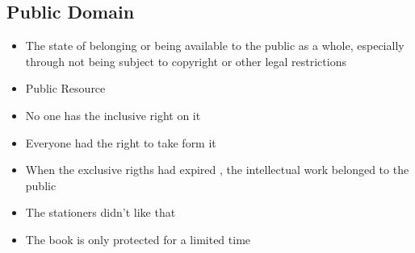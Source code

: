 \documentclass{article}
\begin{document}
\subsection{Public Domain }
\begin{itemize}
\item The state of belonging or being available to the public as a whole, especially through not being subject to copyright or other legal restrictions
\item Public Resource 
\item No one has the inclusive right on it 
\item Everyone had the right to take form it 
\item When the exclusive rigths had expired , the intellectual work belonged to the public 
\item The stationers didn't like that 
\item The book is only protected for a limited time 
\end{itemize}
\end{document}
